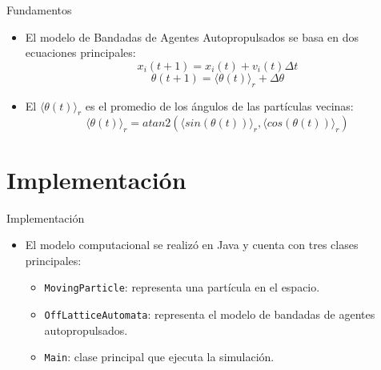 \documentclass{beamer}
\begin{document}
            \begin{frame}{Fundamentos}
                \begin{itemize}
                    \item El modelo de Bandadas de Agentes Autopropulsados se basa en dos ecuaciones principales:
                        \begin{equation*}
                            x_i(t+1) = x_i(t) + v_i(t) \Delta t\label{eq:equation1}
                        \end{equation*}
                        \begin{equation*}
                            \theta(t+1) = \langle \theta(t) \rangle_r+ \Delta \theta\label{eq:equation2}
                        \end{equation*}
                    \item El $\langle \theta(t) \rangle_r$ es el promedio de los ángulos de las partículas vecinas:
                        \begin{equation*}
                            \langle \theta(t) \rangle_r = atan2(\langle sin(\theta(t)) \rangle_r, \langle cos(\theta(t)) \rangle_r)
                        \end{equation*}
                \end{itemize}
            \end{frame}

    \section{Implementación}

        \begin{frame}{Implementación}
            \begin{itemize}
                \item El modelo computacional se realizó en Java y cuenta con tres clases principales:
                \begin{itemize}
                    \item \texttt{MovingParticle}: representa una partícula en el espacio.
                    \item \texttt{OffLatticeAutomata}: representa el modelo de bandadas de agentes autopropulsados.
                    \item \texttt{Main}: clase principal que ejecuta la simulación.
                \end{itemize}
            \end{itemize}
        \end{frame}
\end{document}
